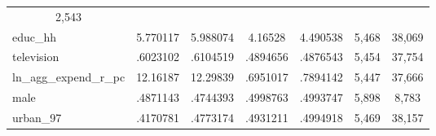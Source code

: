 \begin{table}[!h]
\begin{tabular}{lllllll}
  \multicolumn{1}{c}{2,543} \\
\multicolumn{1}{l}{educ\_hh} &
  \multicolumn{1}{|c}{5.770117} &
  \multicolumn{1}{c}{5.988074} &
  \multicolumn{1}{c}{4.16528} &
  \multicolumn{1}{c}{4.490538} &
  \multicolumn{1}{c}{5,468} &
  \multicolumn{1}{c}{38,069} \\
\multicolumn{1}{l}{television} &
  \multicolumn{1}{|c}{.6023102} &
  \multicolumn{1}{c}{.6104519} &
  \multicolumn{1}{c}{.4894656} &
  \multicolumn{1}{c}{.4876543} &
  \multicolumn{1}{c}{5,454} &
  \multicolumn{1}{c}{37,754} \\
\multicolumn{1}{l}{ln\_agg\_expend\_r\_pc} &
  \multicolumn{1}{|c}{12.16187} &
  \multicolumn{1}{c}{12.29839} &
  \multicolumn{1}{c}{.6951017} &
  \multicolumn{1}{c}{.7894142} &
  \multicolumn{1}{c}{5,447} &
  \multicolumn{1}{c}{37,666} \\
\multicolumn{1}{l}{male} &
  \multicolumn{1}{|c}{.4871143} &
  \multicolumn{1}{c}{.4744393} &
  \multicolumn{1}{c}{.4998763} &
  \multicolumn{1}{c}{.4993747} &
  \multicolumn{1}{c}{5,898} &
  \multicolumn{1}{c}{8,783} \\
\multicolumn{1}{l}{urban\_97} &
  \multicolumn{1}{|c}{.4170781} &
  \multicolumn{1}{c}{.4773174} &
  \multicolumn{1}{c}{.4931211} &
  \multicolumn{1}{c}{.4994918} &
  \multicolumn{1}{c}{5,469} &
  \multicolumn{1}{c}{38,157} \\
\cline{1-7}
\end{tabular}
\end{table}
